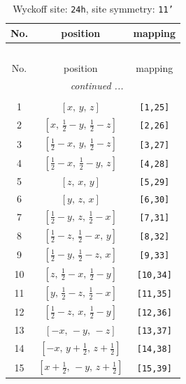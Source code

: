\documentclass[fleqn,8pt]{jsarticle}
\begin{document}
\begin{longtable}{ccc}
\caption{Wyckoff site: {\tt 24h}, site symmetry: {\tt 11'}}
 \\
 \hline \hline
No. & position & mapping \\ \hline \endfirsthead

\multicolumn{2}{l}{\tablename\ \thetable{}} \\
 \hline \hline
No. & position & mapping \\ \hline \endhead

 \hline \hline
\multicolumn{2}{r}{\footnotesize\it continued ...} \\ \endfoot

 \hline \hline
\multicolumn{2}{r}{} \\ \endlastfoot

1 & $\left[ x,\, y,\, z \right]$ & {\tt [1,25]} \\ \hline
2 & $\left[ x,\, \frac{1}{2} - y,\, \frac{1}{2} - z \right]$ & {\tt [2,26]} \\ \hline
3 & $\left[ \frac{1}{2} - x,\, y,\, \frac{1}{2} - z \right]$ & {\tt [3,27]} \\ \hline
4 & $\left[ \frac{1}{2} - x,\, \frac{1}{2} - y,\, z \right]$ & {\tt [4,28]} \\ \hline
5 & $\left[ z,\, x,\, y \right]$ & {\tt [5,29]} \\ \hline
6 & $\left[ y,\, z,\, x \right]$ & {\tt [6,30]} \\ \hline
7 & $\left[ \frac{1}{2} - y,\, z,\, \frac{1}{2} - x \right]$ & {\tt [7,31]} \\ \hline
8 & $\left[ \frac{1}{2} - z,\, \frac{1}{2} - x,\, y \right]$ & {\tt [8,32]} \\ \hline
9 & $\left[ \frac{1}{2} - y,\, \frac{1}{2} - z,\, x \right]$ & {\tt [9,33]} \\ \hline
10 & $\left[ z,\, \frac{1}{2} - x,\, \frac{1}{2} - y \right]$ & {\tt [10,34]} \\ \hline
11 & $\left[ y,\, \frac{1}{2} - z,\, \frac{1}{2} - x \right]$ & {\tt [11,35]} \\ \hline
12 & $\left[ \frac{1}{2} - z,\, x,\, \frac{1}{2} - y \right]$ & {\tt [12,36]} \\ \hline
13 & $\left[ - x,\, - y,\, - z \right]$ & {\tt [13,37]} \\ \hline
14 & $\left[ - x,\, y + \frac{1}{2},\, z + \frac{1}{2} \right]$ & {\tt [14,38]} \\ \hline
15 & $\left[ x + \frac{1}{2},\, - y,\, z + \frac{1}{2} \right]$ & {\tt [15,39]} \\ \hline

\end{longtable}
\end{document}
